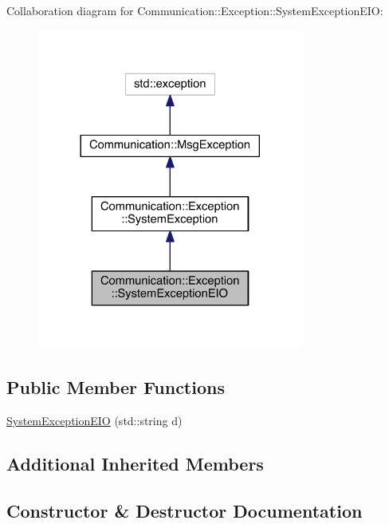 Collaboration diagram for Communication\+:\+:Exception\+:\+:System\+Exception\+E\+I\+O\+:\nopagebreak
\begin{figure}[H]
\begin{center}
\leavevmode
\includegraphics[width=248pt]{class_communication_1_1_exception_1_1_system_exception_e_i_o__coll__graph}
\end{center}
\end{figure}
\subsection*{Public Member Functions}
\begin{DoxyCompactItemize}
\item 
\hyperlink{class_communication_1_1_exception_1_1_system_exception_e_i_o_ac1ef03d32d9bf15a2b6da10fa9a99894}{System\+Exception\+E\+I\+O} (std\+::string d)
\end{DoxyCompactItemize}
\subsection*{Additional Inherited Members}


\subsection{Constructor \& Destructor Documentation}
\hypertarget{class_communication_1_1_exception_1_1_system_exception_e_i_o_ac1ef03d32d9bf15a2b6da10fa9a99894}{}
